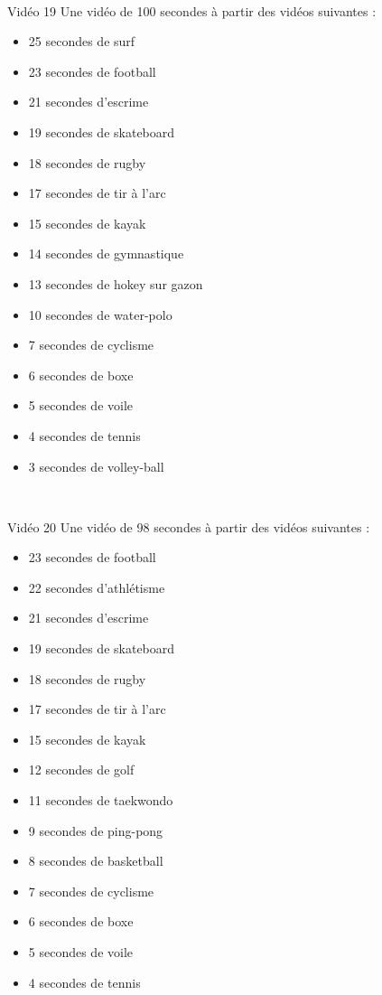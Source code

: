 \documentclass[10pt, a5paper,twoside]{article}
\begin{document}
\vfill

\clearpage
~
\vfill

\begin{card}[width = \textwidth, colback = olympicgreen, colframe = olympicgreen, bottomtitle = 2mm]{Vidéo 19}
  Une vidéo de 100 secondes à partir des vidéos suivantes :
  \vspace{-5mm}\begin{itemize}
    \item 25 secondes de surf
    \item 23 secondes de football
    \item 21 secondes d'escrime
    \item 19 secondes de skateboard
    \item 18 secondes de rugby
    \item 17 secondes de tir à l'arc
    \item 15 secondes de kayak
    \item 14 secondes de gymnastique
    \item 13 secondes de hokey sur gazon
    \item 10 secondes de water-polo
    \item 7 secondes de cyclisme
    \item 6 secondes de boxe
    \item 5 secondes de voile
    \item 4 secondes de tennis
    \item 3 secondes de volley-ball
  \end{itemize}
\end{card}

\vfill

\clearpage
~
\vfill

\begin{card}[width = \textwidth, colback = olympicgreen, colframe = olympicgreen, bottomtitle = 2mm]{Vidéo 20}
  Une vidéo de 98 secondes à partir des vidéos suivantes :
  \vspace{-1mm}\begin{itemize}
    \item 23 secondes de football
    \item 22 secondes d'athlétisme
    \item 21 secondes d'escrime
    \item 19 secondes de skateboard
    \item 18 secondes de rugby
    \item 17 secondes de tir à l'arc
    \item 15 secondes de kayak
    \item 12 secondes de golf
    \item 11 secondes de taekwondo
    \item 9 secondes de ping-pong
    \item 8 secondes de basketball
    \item 7 secondes de cyclisme
    \item 6 secondes de boxe
    \item 5 secondes de voile
    \item 4 secondes de tennis
  \end{itemize}
\end{card}
\end{document}
